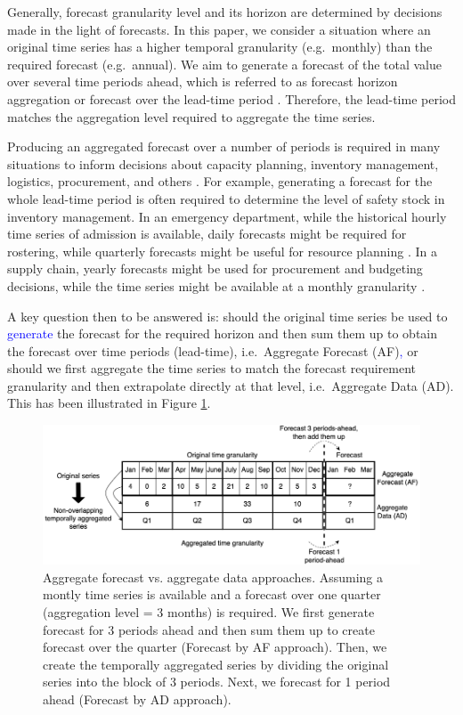 \documentclass[preprint, 3p,
authoryear]{elsarticle} %
\begin{document}
Generally, forecast granularity level and its horizon are determined by
decisions made in the light of forecasts. In this paper, we consider a
situation where an original time series has a higher temporal
granularity (e.g.~monthly) than the required forecast (e.g.~annual). We
aim to generate a forecast of the total value over several time periods
ahead, which is referred to as forecast horizon aggregation or forecast
over the lead-time period \citep{mohammadipour2012forecast}. Therefore,
the lead-time period matches the aggregation level required to aggregate
the time series.

Producing an aggregated forecast over a number of periods is required in
many situations to inform decisions about capacity planning, inventory
management, logistics, procurement, and others
\citep{nikolopoulos2011aggregate, zotteri2007model}. For example,
generating a forecast for the whole lead-time period is often required
to determine the level of safety stock in inventory management. In an
emergency department, while the historical hourly time series of
admission is available, daily forecasts might be required for rostering,
while quarterly forecasts might be useful for resource planning
\citep{rostami2020anticipating}. In a supply chain, yearly forecasts
might be used for procurement and budgeting decisions, while the time
series might be available at a monthly granularity
\citep{mircetic2021forecasting}.

A key question then to be answered is: should the original time series
be used to \textcolor{blue}{generate} the forecast for the required
horizon and then sum them up to obtain the forecast over time periods
(lead-time), i.e.~Aggregate Forecast (AF)\textcolor{blue}{,} or should
we first aggregate the time series to match the forecast requirement
granularity and then extrapolate directly at that level, i.e.~Aggregate
Data (AD). This has been illustrated in Figure \ref{fig:example_oanoa}.

\begin{figure}[H]
\includegraphics[width=0.9\linewidth]{img/300dpi/nota} \caption{Aggregate forecast vs. aggregate data approaches. Assuming a montly time series is available and a forecast over one quarter (aggregation level = 3 months) is required. We first generate forecast for 3 periods ahead and then sum them up to create forecast over the quarter (Forecast by AF approach). Then, we create the temporally aggregated series by dividing the original series into the block of 3 periods. Next, we forecast for 1 period ahead (Forecast by AD approach).}\label{fig:example_oanoa}
\end{figure}
\end{document}
